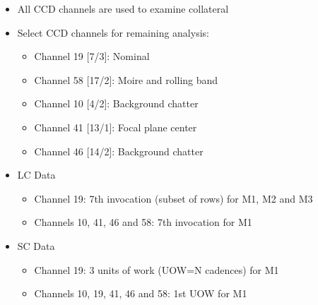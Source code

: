 \begin{itemize}

\item All CCD channels are used to examine collateral
\item Select CCD channels for remaining analysis:

  \begin{itemize}
    \item Channel 19 [7/3]: Nominal
    \item Channel 58 [17/2]: Moire and rolling band
    \item Channel 10 [4/2]: Background chatter
    \item Channel 41 [13/1]: Focal plane center
    \item Channel 46 [14/2]: Background chatter
  \end{itemize}

\item LC Data

  \begin{itemize}
    \item Channel 19: 7th invocation (subset of rows) for M1, M2 and M3
    \item Channels 10, 41, 46 and 58: 7th invocation for M1 
  \end{itemize}

\item SC Data

  \begin{itemize}
    \item Channel 19: 3 units of work (UOW=N cadences) for M1
    \item Channels 10, 19, 41, 46 and 58: 1st UOW for M1
  \end{itemize}

\end{itemize}
